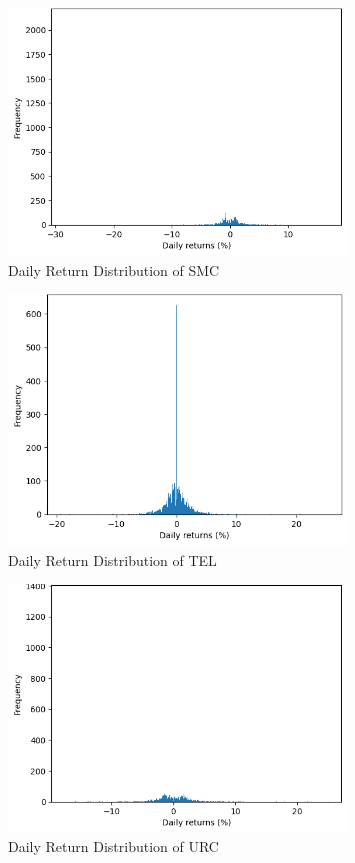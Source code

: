 \begin{figure}[ht]
    \centering
    \includegraphics[width=0.80\textwidth]{./assets/Appendices/B/Distribution_DailyReturns/SMC.png}
    \caption{Daily Return Distribution of SMC}
    \label{fig:returndist_SMC}
\end{figure}
\FloatBarrier

\begin{figure}[ht]
    \centering
    \includegraphics[width=0.80\textwidth]{./assets/Appendices/B/Distribution_DailyReturns/TEL.png}
    \caption{Daily Return Distribution of TEL}
    \label{fig:returndist_TEL}
\end{figure}
\FloatBarrier

\begin{figure}[ht]
    \centering
    \includegraphics[width=0.80\textwidth]{./assets/Appendices/B/Distribution_DailyReturns/URC.png}
    \caption{Daily Return Distribution of URC}
    \label{fig:returndist_URC}
\end{figure}
\FloatBarrier


